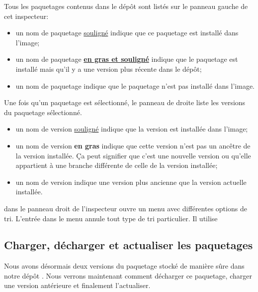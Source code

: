 \documentclass[a4paper,10pt,twoside]{book}
\begin{document}
Tous les paquetages contenus dans le dépôt sont listés sur le panneau
gauche de cet inspecteur:

\begin{itemize}
\item un nom de paquetage \underline{souligné} indique que ce
  paquetage est installé dans l'image;
\item un nom de paquetage \underline{\bf en gras et souligné} indique
  que le paquetage est installé mais qu'il y a une version plus
  récente dans le dépôt;
\item un nom de paquetage  indique que le
  paquetage n'est pas installé dans l'image.
\end{itemize}

\noindent
Une fois qu'un paquetage est sélectionné, le panneau de droite liste
les versions du paquetage sélectionné. %

\begin{itemize}
\item un nom de version \underline{souligné} indique que la version
  est installée dans l'image;
\item un nom de version {\bf en gras} indique que cette version n'est
  pas un ancêtre de la version installée. Ça peut signifier que c'est
  une nouvelle version ou qu'elle appartient à une branche différente
  de celle de la version installée;
\item un nom de version  indique une
  version plus ancienne que la version actuelle installée.
\end{itemize}

{\Actclick} dans le panneau droit de l'inspecteur \RI ouvre un menu
avec différentes options de tri. %
L'entrée  dans le menu annule tout type de tri
particulier. Il utilise 

\subsection{Charger, décharger et actualiser les paquetages}

Nous avons désormais deux versions du paquetage 
 stocké de manière sûre %
dans notre dépôt  . Nous verrons maintenant comment
décharger ce paquetage, charger une version antérieure et finalement
l'actualiser.
\end{document}
